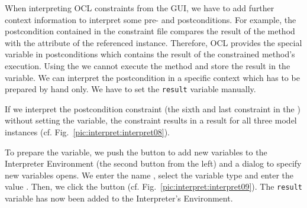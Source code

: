 When interpreting OCL constraints from the GUI, we have to add further context 
information to interpret some pre- and postconditions. For example, the 
postcondition contained in the constraint file compares the result of the 
method  with the attribute  of the referenced 
 instance. Therefore, \acs{OCL} provides the special variable 
 in postconditions which contains the result of the constrained 
method's execution. Using the  we cannot 
execute the method  and store the result in the  
variable. We can interpret the postcondition in a specific context which has to 
be prepared by hand only. We have to set the \texttt{result} variable manually.

If we interpret the postcondition constraint (the sixth and last constraint in 
the ) without setting the  variable, the 
constraint results in a  result for all three model instances
(cf. Fig.~\ref{pic:interpret:interpret08}).

To prepare the variable, we push the button to add new variables to the 
Interpreter Environment (the second button from the left) and a dialog to
specify new variables opens. We enter the name , select the
variable type  and enter the value . Then, we click the
 button (cf. Fig.~\ref{pic:interpret:interpret09}). The
\texttt{result} variable has now been added to the Interpreter's Environment.

